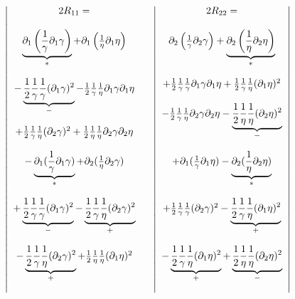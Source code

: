 \begin{align}
  \left| \begin{array}{c}
 2R_{11} = \\\\
  \underbrace{\partial_{1}\left(\frac{1}{\gamma}\partial_{1} \gamma\right)}_{*}+\partial_{1}\left(\frac{1}{\eta}\partial_{1} \eta\right) \\\\
  - \underbrace{\frac{1}{2} \frac{1}{\gamma}\frac{1}{\gamma}(\partial_1 \gamma )^2}_{-} - \frac{1}{2} \frac{1}{\gamma}\frac{1}{\eta}\partial_1 \gamma \partial_{1} \eta \\\\
   + \frac{1}{2}\frac{1}{\gamma}\frac{1}{\eta}(\partial_2 \gamma)^2 +\frac{1}{2}\frac{1}{\eta}\frac{1}{\eta}\partial_2 \gamma \partial_{2} \eta \\\\
 -\underbrace{\partial_1(\frac{1}{\gamma}\partial_1 \gamma)}_{*}+\partial_2( \frac{1}{\eta}\partial_2 \gamma)  
 \\\\
  + \underbrace{\frac{1}{2}\frac{1}{\gamma}\frac{1}{\gamma}(\partial_1 \gamma)^2}_{-}- \underbrace{\frac{1}{2} \frac{1}{\gamma}\frac{1}{\eta}(\partial_2 \gamma )^2}_{+} \\\\
 - \underbrace{\frac{1}{2} \frac{1}{\gamma}\frac{1}{\eta}(\partial_2 \gamma)^2}_{+}+ \frac{1}{2}\frac{1}{\eta}\frac{1}{\eta}(\partial_1 \eta)^2\\\\
 \end {array}\quad
 \right.
 \left | \begin{array}{c}
  2R_{22} = \\\\
    \partial_{2}\left(\frac{1}{\gamma}\partial_{2} \gamma\right)+\underbrace{\partial_{2}\left(\frac{1}{\eta}\partial_{2} \eta\right)}_{*} \\\\
   + \frac{1}{2}\frac{1}{\gamma}\frac{1}{\gamma}\partial_{1} \gamma\partial_1 \eta  + \frac{1}{2}\frac{1}{\gamma}\frac{1}{\eta}(\partial_1 \eta )^2 \\\\
   - \frac{1}{2} \frac{1}{\gamma}\frac{1}{\eta}\partial_{2} \gamma\partial_2 \eta  - \underbrace{\frac{1}{2} \frac{1}{\eta}\frac{1}{\eta}(\partial_2 \eta)^2 }_{-} \\\\
 +\partial_1(\frac{1}{\gamma}\partial_1 \eta)-\underbrace{\partial_2( \frac{1}{\eta}\partial_2 \eta)}_{*}  
 \\\\
  + \frac{1}{2}\frac{1}{\gamma}\frac{1}{\gamma}(\partial_2 \gamma)^2- \underbrace{\frac{1}{2}\frac{1}{\gamma}\frac{1}{\eta}(\partial_1 \eta )^2}_{+}\\\\
 - \underbrace{\frac{1}{2}\frac{1}{\gamma}\frac{1}{\eta}(\partial_1 \eta)^2}_{+}+ \underbrace{\frac{1}{2} \frac{1}{\eta}\frac{1}{\eta}(\partial_2 \eta)^2}_{-}\\\\
 \end {array}\right|
\end{align}
